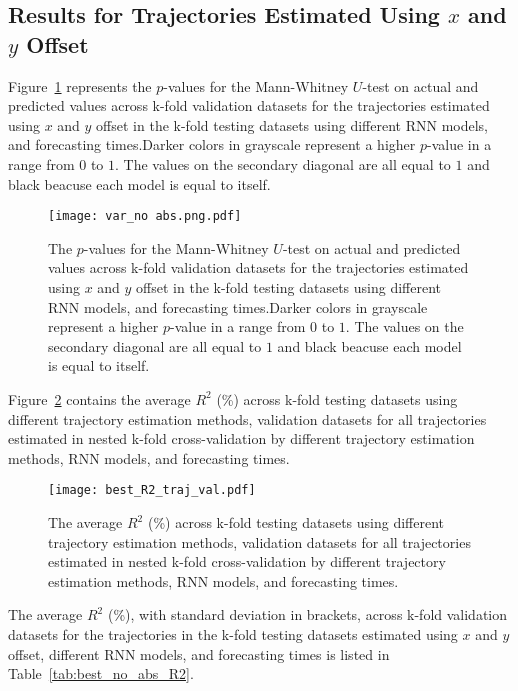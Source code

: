 \subsection{Results for Trajectories Estimated Using $x$ and $y$ Offset}

Figure~\ref{fig:var_no abs.png} represents the $p$-values for the Mann-Whitney $U$-test on actual and predicted values across k-fold validation datasets for the trajectories estimated using $x$ and $y$ offset in the k-fold testing datasets using different RNN models, and forecasting times.Darker colors in grayscale represent a higher $p$-value in a range from $0$ to $1$. The values on the secondary diagonal are all equal to $1$ and black beacuse each model is equal to itself.

\begin{figure}[!ht]
	\centering
	\texttt{[image: var\_no abs.png.pdf]}
	\caption{The $p$-values for the Mann-Whitney $U$-test on actual and predicted values across k-fold validation datasets for the trajectories estimated using $x$ and $y$ offset in the k-fold testing datasets using different RNN models, and forecasting times.Darker colors in grayscale represent a higher $p$-value in a range from $0$ to $1$. The values on the secondary diagonal are all equal to $1$ and black beacuse each model is equal to itself.}
	\label{fig:var_no abs.png}
\end{figure}

Figure~\ref{fig:best_R2_traj_val} contains the average $R^{2}$ (\%) across k-fold testing datasets using different trajectory estimation methods, validation datasets for all trajectories estimated in nested k-fold cross-validation by different trajectory estimation methods, RNN models, and forecasting times.

\begin{figure}[!ht]
	\centering
	\texttt{[image: best\_R2\_traj\_val.pdf]}
	\caption{The average $R^{2}$ (\%) across k-fold testing datasets using different trajectory estimation methods, validation datasets for all trajectories estimated in nested k-fold cross-validation by different trajectory estimation methods, RNN models, and forecasting times.}
	\label{fig:best_R2_traj_val}
\end{figure}

The average $R^{2}$ (\%), with standard deviation in brackets, across k-fold validation datasets for the trajectories in the k-fold testing datasets estimated using $x$ and $y$ offset, different RNN models, and forecasting times is listed in Table~\ref{tab:best_no_abs_R2}.

